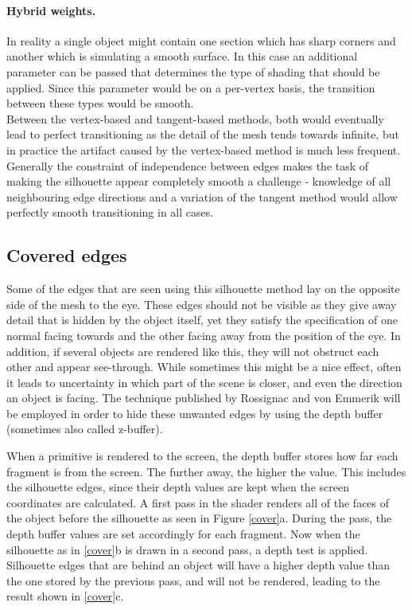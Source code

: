 \documentclass[a4paper,10pt]{article}
\begin{document}
\paragraph{Hybrid weights.}
In reality a single object might contain one section which has sharp corners and another which is simulating a smooth surface. In this case an additional parameter can be passed that determines the type of shading that should be applied. Since this parameter would be on a per-vertex basis, the transition between these types would be smooth.\\

Between the vertex-based and tangent-based methods, both would eventually lead to perfect transitioning as the detail of the mesh tends towards infinite, but in practice the artifact caused by the vertex-based method is much less frequent. Generally the constraint of independence between edges makes the task of making the silhouette appear completely smooth a challenge - knowledge of all neighbouring edge directions and a variation of the tangent method would allow perfectly smooth transitioning in all cases.


\subsection{Covered edges}
Some of the edges that are seen using this silhouette method lay on the opposite side of the mesh to the eye. These edges should not be visible as they give away detail that is hidden by the object itself, yet they satisfy the specification of one normal facing towards and the other facing away from the position of the eye. In addition, if several objects are rendered like this, they will not obstruct each other and appear see-through. While sometimes this might be a nice effect, often it leads to uncertainty in which part of the scene is closer, and even the direction an object is facing. The technique published by Rossignac and von Emmerik \cite{Rossignac1992} will be employed in order to hide these unwanted edges by using the depth buffer (sometimes also called z-buffer).

When a primitive is rendered to the screen, the depth buffer stores how far each fragment is from the screen. The further away, the higher the value. This includes the silhouette edges, since their depth values are kept when the screen coordinates are calculated. A first pass in the shader renders all of the faces of the object before the silhouette as seen in Figure \ref{cover}a. During the pass, the depth buffer values are set accordingly for each fragment. Now when the silhouette as in \ref{cover}b is drawn in a second pass, a depth test is applied. Silhouette edges that are behind an object will have a higher depth value than the one stored by the previous pass, and will not be rendered, leading to the result shown in \ref{cover}c.
\end{document}
